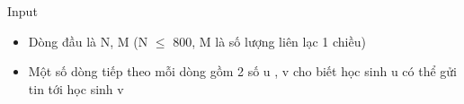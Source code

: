 Input
\begin{itemize}
	\item Dòng đầu là N, M (N  $\le$  800, M là số lượng liên lạc 1 chiều)
	\item Một số dòng tiếp theo mỗi dòng gồm 2 số u , v cho biết học sinh u có thể gửi tin tới học sinh v
\end{itemize}